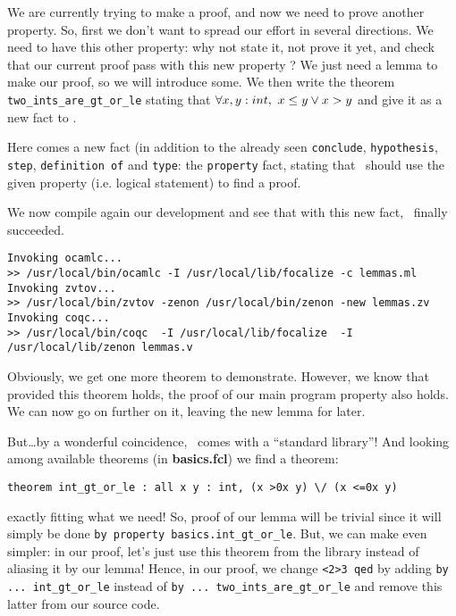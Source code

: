 \documentclass[11pt,a4paper,twoside,onecolumn,fullpage]{article}
\begin{document}
\medskip
We are currently trying to make a proof, and now we need to prove
another property. So, first we don't want to spread our effort in
several directions. We need to have this other property: why not state
it, not prove it yet, and check that our current proof pass with this
new property ? We just need a lemma to make our proof, so we will
introduce some. We then write the theorem
\lstinline"two_ints_are_gt_or_le"
stating that $\forall x, y : int,\ x \le y \vee x > y$ and give it
as a new fact to \zenon.

Here comes a new fact  (in addition to the
already seen \lstinline"conclude", \lstinline"hypothesis",
\lstinline"step", \lstinline"definition of" and \lstinline"type": the
\lstinline"property" fact, stating that \zenon\ should use the given
property (i.e. logical statement) to find a proof.

{\scriptsize
}

We now compile again our development and see that with this new fact,
\zenon\ finally succeeded.

{\scriptsize
\begin{verbatim}
Invoking ocamlc...
>> /usr/local/bin/ocamlc -I /usr/local/lib/focalize -c lemmas.ml
Invoking zvtov...
>> /usr/local/bin/zvtov -zenon /usr/local/bin/zenon -new lemmas.zv
Invoking coqc...                                                
>> /usr/local/bin/coqc  -I /usr/local/lib/focalize  -I /usr/local/lib/zenon lemmas.v
\end{verbatim}}

Obviously, we get one more theorem to demonstrate. However, we know
that provided this theorem holds, the proof of our main program
property also holds. We can now go on further on it, leaving the new
lemma for later.

But\ldots by a wonderful coincidence, \focal\ comes with a ``standard
library''! And looking among available theorems (in
\textbf{basics.fcl}) we find a theorem:

{\scriptsize
\begin{lstlisting}
theorem int_gt_or_le : all x y : int, (x >0x y) \/ (x <=0x y)
\end{lstlisting}}

\noindent exactly fitting what we need! So, proof of our lemma will be
trivial since it will simply be done \lstinline"by property basics.int_gt_or_le".
But, we can make even simpler: in our proof, let's just use this
theorem from the library instead of aliasing it by our lemma! Hence,
in our proof, we change \lstinline"<2>3 qed" by adding
\lstinline"by ... int_gt_or_le" instead of 
\lstinline"by ... two_ints_are_gt_or_le" and remove this latter from
our source code.
\end{document}
